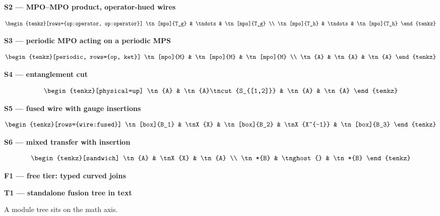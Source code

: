 \documentclass[varwidth=19cm, border=8pt]{standalone}
\newcommand{\head}[1]{\par\medskip\noindent\textbf{#1}\par\smallskip}
\begin{document}
\head{S2 — MPO--MPO product, operator-hued wires}
\[
  \begin{tenkz}[rows={op:operator, op:operator}]
    \tn[mpo]{T_g} & \tndots & \tn[mpo]{T_g} \\
    \tn[mpo]{T_h} & \tndots & \tn[mpo]{T_h}
  \end{tenkz}
\]

\head{S3 — periodic MPO acting on a periodic MPS}
\[
  \begin{tenkz}[periodic, rows={op, ket}]
    \tn[mpo]{M} & \tn[mpo]{M} & \tn[mpo]{M} \\
    \tn{A} & \tn{A} & \tn{A}
  \end{tenkz}
\]

\head{S4 — entanglement cut}
\[
  \begin{tenkz}[physical=up]
    \tn{A} & \tn{A}\tncut{S_{[1,2]}} & \tn{A} & \tn{A}
  \end{tenkz}
\]

\head{S5 — fused wire with gauge insertions}
\[
  \begin{tenkz}[rows={wire:fused}]
    \tn[box]{B_1} & \tnX{X} & \tn[box]{B_2} & \tnX{X^{-1}} & \tn[box]{B_3}
  \end{tenkz}
\]

\head{S6 — mixed transfer with insertion}
\[
  \begin{tenkz}[sandwich]
    \tn{A} & \tnX{X} & \tn{A} \\
    \tn*{B} & \tnghost{} & \tn*{B}
  \end{tenkz}
\]

\head{F1 — free tier: typed curved joins}
\begin{tenkzfree}
\end{tenkzfree}

\head{T1 — standalone fusion tree in text}
A module tree  sits on the math axis.
\end{document}
